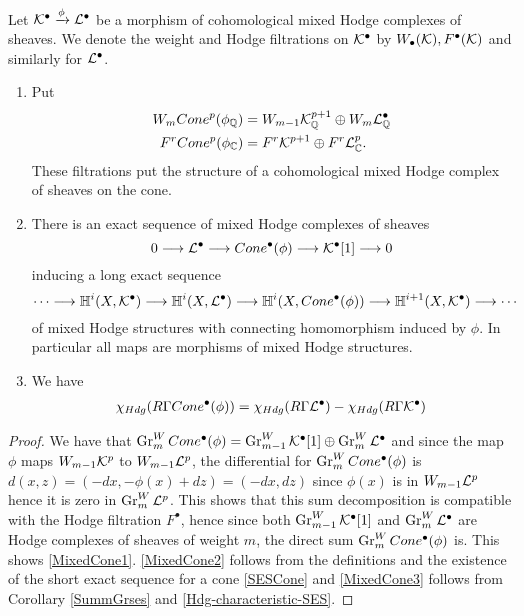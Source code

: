 \documentclass[../main.tex]{subfiles}
\begin{document}
\begin{theorem} \textup{\cite[Thm. 3.22]{PS08}} \label{MixedCone}
    Let $\mathcal{K}^\bullet \xrightarrow{\phi} \mathcal{L}^\bullet $ be a morphism of cohomological mixed Hodge complexes of sheaves. We denote the weight and Hodge filtrations on $\mathcal{K}^\bullet$ by $W_\bullet(\mathcal{K}), F^\bullet(\mathcal{K})$ and similarly for $\mathcal{L}^\bullet$.
    \begin{enumerate}
        \item \label{MixedCone1} Put \begin{align*}
            W_m Cone^p(\phi_{\mathbb{Q}}) &= W_{m-1}\mathcal{K}^{p+1}_{\mathbb{Q}} \oplus W_m\mathcal{L}^\bullet_{\mathbb{Q}} \\
            F^r Cone^p(\phi_{\mathbb{C}} ) &= F^r \mathcal{K}^{p+1} \oplus F^r \mathcal{L}^p_{\mathbb{C}}.
        \end{align*}
        These filtrations put the structure of a cohomological mixed Hodge complex of sheaves on the cone.
        \item \label{MixedCone2} There is an exact sequence of mixed Hodge complexes of sheaves
        \[
         0 \longrightarrow \mathcal{L}^\bullet \longrightarrow Cone^\bullet(\phi) \longrightarrow \mathcal{K}^\bullet[1] \longrightarrow 0
        \]
        inducing a long exact sequence 
        \[
          \cdots \longrightarrow \mathbb{H}^i(X,\mathcal{K}^\bullet) \longrightarrow \mathbb{H}^i(X,\mathcal{L}^\bullet) \longrightarrow \mathbb{H}^i(X,Cone^\bullet(\phi))\longrightarrow \mathbb{H}^{i+1}(X,\mathcal{K}^\bullet) \longrightarrow  \cdots
        \]
        of mixed Hodge structures with connecting homomorphism induced by $\phi$. In particular all maps are morphisms of mixed Hodge structures.
        \item \label{MixedCone3} We have
        \begin{align} \label{CharCone}
        \chi_{Hdg}(R\Gamma Cone^\bullet(\phi))=\chi_{Hdg}(R\Gamma\mathcal{L}^\bullet)-\chi_{Hdg}(R\Gamma\mathcal{K}^\bullet)
        \end{align}
    \end{enumerate}
\end{theorem}
\begin{proof}
    We have that $\operatorname{Gr}^W_m Cone^\bullet(\phi) = \operatorname{Gr}^W_{m-1} \mathcal{K}^\bullet[1] \oplus \operatorname{Gr}^W_m \mathcal{L}^\bullet$ and since the map $\phi$ maps $W_{m-1}\mathcal{K}^p$ to $W_{m-1}\mathcal{L}^p$, the differential for $\operatorname{Gr}^W_m Cone^\bullet(\phi)$ is $d(x,z) = (-dx,-\phi(x)+dz) = (-dx, dz)$ since $\phi(x) $ is in $W_{m-1}\mathcal{L}^p$ hence it is zero in $\operatorname{Gr}^W_m \mathcal{L}^p$. This shows that this sum decomposition is compatible with the Hodge filtration $F^\bullet$, hence since both  $\operatorname{Gr}^W_{m-1} \mathcal{K}^\bullet[1]$ and $\operatorname{Gr}^W_m \mathcal{L}^\bullet$ are Hodge complexes of sheaves of weight $m$, the direct sum $\operatorname{Gr}^W_m Cone^\bullet(\phi)$ is. This shows \eqref{MixedCone1}. \eqref{MixedCone2} follows from the definitions and the existence of the short exact sequence for a cone \eqref{SESCone} and \eqref{MixedCone3} follows from Corollary \ref{SummGrses} and \eqref{Hdg-characteristic-SES}. 
\end{proof}
\end{document}
